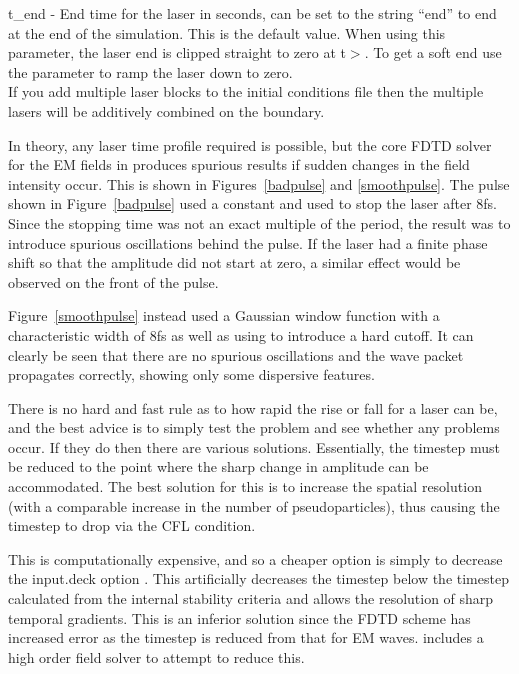 {\emphtext t\_end} - End time for the laser in seconds, can be set to the
  string ``end'' to end at the end of the simulation. This is the default value.
  When using this parameter, the laser end is clipped straight to zero at
  t$>$. To get a soft end use the 
  parameter to ramp the laser down to zero.\\

If you add multiple laser blocks to the initial conditions file then the
multiple lasers will be additively combined on the boundary.

In theory, any laser time profile required is possible, but the core FDTD
solver for the EM fields in {\EPOCH} produces spurious results if sudden
changes in the field intensity occur. This is shown in Figures~\ref{badpulse}
and \ref{smoothpulse}. The pulse shown in Figure~\ref{badpulse} used a constant
 and used  to stop the laser after
8fs. Since the stopping time was not an exact multiple of the period, the
result was to introduce spurious oscillations behind the pulse. If the laser
had a finite phase shift so that the amplitude did not start at zero, a
similar effect would be observed on the front of the pulse.


Figure~\ref{smoothpulse} instead used a Gaussian window function with a
characteristic width of 8fs as well as using  to introduce
a hard cutoff. It can clearly be seen that there are no spurious oscillations
and the wave packet propagates correctly, showing only some dispersive
features.

There is no hard and fast rule as to how rapid the rise or fall for a laser can
be, and the best advice is to simply test the problem and see whether any
problems occur. If they do then there are various solutions. Essentially, the
timestep must be reduced to the point where the sharp change in amplitude can
be accommodated. The best solution for this is to increase the spatial
resolution (with a comparable increase in the number of pseudoparticles), thus
causing the timestep to drop via the CFL condition.

This is computationally expensive, and so a cheaper option is simply to
decrease the input.deck option . This artificially
decreases the timestep below the timestep calculated from the internal
stability criteria and allows the resolution of sharp temporal gradients. This
is an inferior solution since the FDTD scheme has increased error as the
timestep is reduced from that for EM waves. {\EPOCH}
includes a high order field solver to attempt to reduce this.

